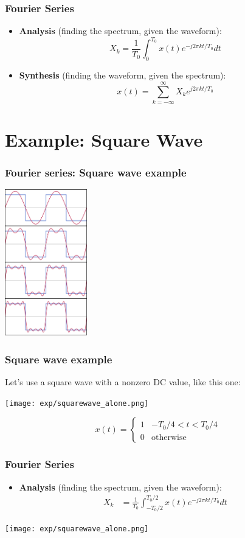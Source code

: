 \documentclass{beamer}
\begin{document}
\begin{frame}
  \frametitle{Fourier Series}

  \begin{itemize}
  \item {\bf Analysis}  (finding the spectrum, given the waveform):
    \[
    X_k = \frac{1}{T_0}\int_0^{T_0} x(t)e^{-j2\pi kt/T_0}dt
    \]
  \item {\bf Synthesis} (finding the waveform, given the spectrum):
    \[
    x(t) = \sum_{k=-\infty}^\infty X_k e^{j2\pi kt/T_0}
    \]
  \end{itemize}
  
\end{frame}  

\section[Square Wave]{Example: Square Wave}
\setcounter{subsection}{1}

\begin{frame}
  \frametitle{Fourier series: Square wave example}
  \centerline{\includegraphics[height=2.5in]{squarewave.png}}
\end{frame}

\begin{frame}
  \frametitle{Square wave example}
  Let's use a square wave with a nonzero DC value, like this one:
  \centerline{\texttt{[image: exp/squarewave\_alone.png]}}
  \[
  x(t) = \left\{\begin{array}{ll}
  1 & -T_0/4 < t < T_0/4 \\
  0 & \mbox{otherwise}
  \end{array}\right.
  \]
\end{frame}

\begin{frame}
  \frametitle{Fourier Series}

  \begin{itemize}
  \item {\bf Analysis}  (finding the spectrum, given the waveform):
    \begin{align*}
    X_k &= \frac{1}{T_0}\int_{-T_0/2}^{T_0/2} x(t)e^{-j2\pi kt/T_0}dt
    \end{align*}
  \end{itemize}
  \centerline{\texttt{[image: exp/squarewave\_alone.png]}}
  
\end{frame}
\end{document}
